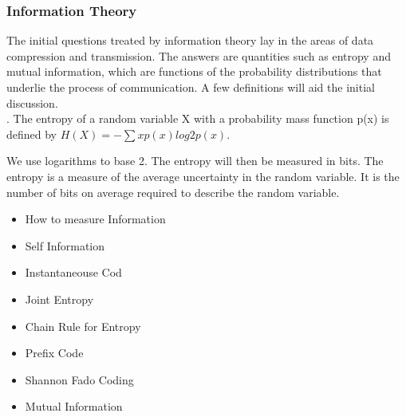\documentclass[a4]{beamer}
\begin{document}
\begin{frame}
\frametitle{Information Theory}
The initial questions treated by information theory lay in the
areas of data compression and transmission. The answers are
quantities such as entropy and mutual information, which are
functions of the probability distributions that underlie the
process of communication. A few definitions will aid the initial
discussion. \\. The entropy
of a random variable X with a probability mass function p(x) is
defined by $H(X) = -\sum x p(x) log2 p(x)$. 
\end{frame}
\begin{frame}
We use logarithms to base 2. The entropy will then be measured in
bits. The entropy is a measure of the average uncertainty in the
random variable. It is the number of bits on average required to
describe the random variable.
\end{frame}
\begin{frame}
\begin{itemize}
\item How to measure Information
\item Self Information
\item Instantaneouse Cod
\item Joint Entropy
\item Chain Rule for Entropy
\item Prefix Code
\item Shannon Fado Coding
\item Mutual Information
\end{itemize}
\end{frame}
\end{document}
